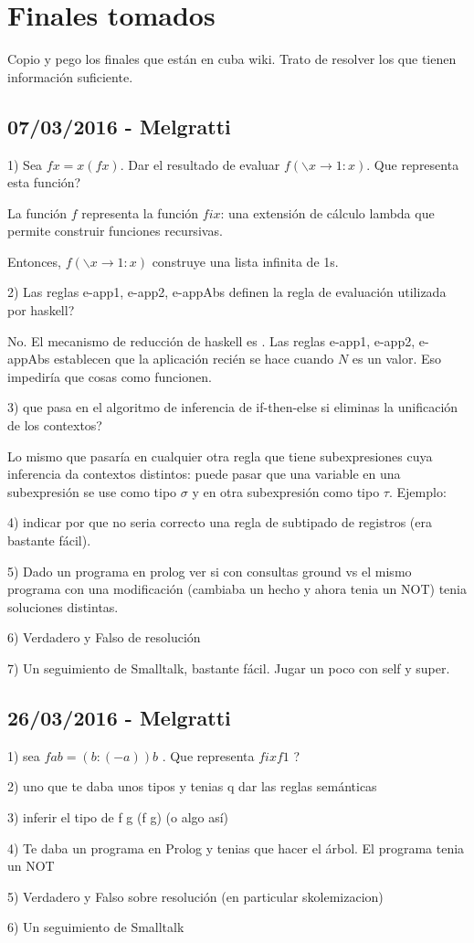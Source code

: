 \section{Finales tomados}

Copio y pego los finales que están en cuba wiki. Trato de resolver los que tienen información suficiente.

\subsection{07/03/2016 - Melgratti}

1) Sea $f x = x (f x)$. Dar el resultado de evaluar $f (\backslash x \to 1:x)$. Que representa esta función?

La función $f$ representa la función $fix$: una extensión de cálculo lambda que permite construir funciones recursivas.

Entonces, $f (\backslash x \to 1:x)$ construye una lista infinita de 1s.

2) Las reglas e-app1, e-app2, e-appAbs definen la regla de evaluación utilizada por haskell?

No. El mecanismo de reducción de haskell es . Las reglas e-app1, e-app2, e-appAbs establecen que la aplicación  recién se hace cuando $N$ es un valor. Eso impediría que cosas como  funcionen.

3) que pasa en el algoritmo de inferencia de if-then-else si eliminas la unificación de los contextos?

Lo mismo que pasaría en cualquier otra regla que tiene subexpresiones cuya inferencia da contextos distintos: puede pasar que una variable en una subexpresión se use como tipo $\sigma$ y en otra subexpresión como tipo $\tau$. Ejemplo: 

4) indicar por que no seria correcto una regla de subtipado de registros (era bastante fácil).

5) Dado un programa en prolog ver si con consultas ground vs el mismo programa con una modificación (cambiaba un hecho y ahora tenia un NOT) tenia soluciones distintas.

6) Verdadero y Falso de resolución

7) Un seguimiento de Smalltalk, bastante fácil. Jugar un poco con self y super.

\subsection{26/03/2016 - Melgratti}

1) sea $f a b = (b:(-a))b$ . Que representa $fix f 1$ ?

2) uno que te daba unos tipos y tenias q dar las reglas semánticas

3) inferir el tipo de f g (f g) (o algo así)

4) Te daba un programa en Prolog y tenias que hacer el árbol. El programa tenia un NOT

5) Verdadero y Falso sobre resolución (en particular skolemizacion)

6) Un seguimiento de Smalltalk
